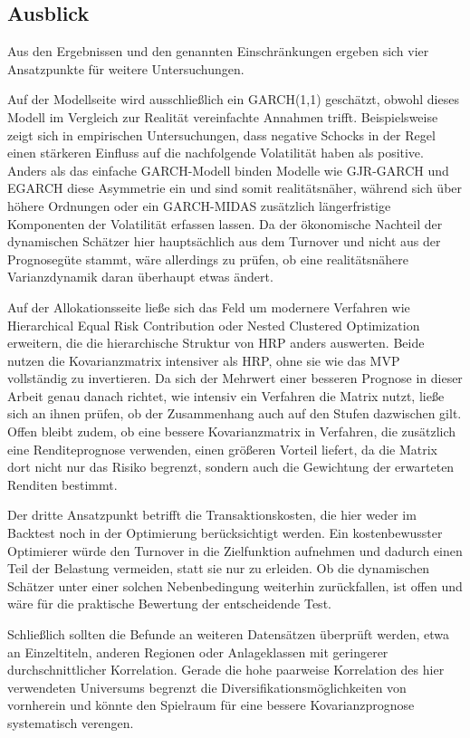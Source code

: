 \documentclass[a4paper, 12pt]{article}
\begin{document}
\subsection{Ausblick}\label{sec:forschung}
Aus den Ergebnissen und den genannten Einschränkungen ergeben sich vier Ansatzpunkte für weitere Untersuchungen.

Auf der Modellseite wird ausschließlich ein GARCH(1,1) geschätzt, obwohl dieses Modell im Vergleich zur Realität vereinfachte Annahmen trifft.
Beispielsweise zeigt sich in empirischen Untersuchungen, dass negative Schocks in der Regel einen stärkeren Einfluss auf die nachfolgende Volatilität haben als positive.
Anders als das einfache GARCH-Modell binden Modelle wie GJR-GARCH und EGARCH diese Asymmetrie ein und sind somit realitätsnäher, während sich über höhere Ordnungen oder ein GARCH-MIDAS zusätzlich längerfristige Komponenten der Volatilität erfassen lassen.
Da der ökonomische Nachteil der dynamischen Schätzer hier hauptsächlich aus dem Turnover und nicht aus der Prognosegüte stammt, wäre allerdings zu prüfen, ob eine realitätsnähere Varianzdynamik daran überhaupt etwas ändert.

Auf der Allokationsseite ließe sich das Feld um modernere Verfahren wie Hierarchical Equal Risk Contribution \parencite{raffinot2018herc} oder Nested Clustered Optimization \parencite{deprado2019nco} erweitern, die die hierarchische Struktur von HRP anders auswerten.
Beide nutzen die Kovarianzmatrix intensiver als HRP, ohne sie wie das MVP vollständig zu invertieren.
Da sich der Mehrwert einer besseren Prognose in dieser Arbeit genau danach richtet, wie intensiv ein Verfahren die Matrix nutzt, ließe sich an ihnen prüfen, ob der Zusammenhang auch auf den Stufen dazwischen gilt.
Offen bleibt zudem, ob eine bessere Kovarianzmatrix in Verfahren, die zusätzlich eine Renditeprognose verwenden, einen größeren Vorteil liefert, da die Matrix dort nicht nur das Risiko begrenzt, sondern auch die Gewichtung der erwarteten Renditen bestimmt.

Der dritte Ansatzpunkt betrifft die Transaktionskosten, die hier weder im Backtest noch in der Optimierung berücksichtigt werden.
Ein kostenbewusster Optimierer würde den Turnover in die Zielfunktion aufnehmen und dadurch einen Teil der Belastung vermeiden, statt sie nur zu erleiden.
Ob die dynamischen Schätzer unter einer solchen Nebenbedingung weiterhin zurückfallen, ist offen und wäre für die praktische Bewertung der entscheidende Test.

Schließlich sollten die Befunde an weiteren Datensätzen überprüft werden, etwa an Einzeltiteln, anderen Regionen oder Anlageklassen mit geringerer durchschnittlicher Korrelation.
Gerade die hohe paarweise Korrelation des hier verwendeten Universums begrenzt die Diversifikationsmöglichkeiten von vornherein und könnte den Spielraum für eine bessere Kovarianzprognose systematisch verengen.
\end{document}
